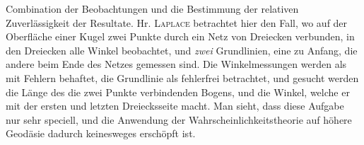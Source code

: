 Combination der Beobachtungen und die Bestimmung der relativen Zuverlässigkeit der Resultate. Hr. \textsc{Laplace} betrachtet hier den Fall, wo auf der Oberfläche einer Kugel zwei Punkte durch ein Netz von Dreiecken verbunden, in den Dreiecken alle Winkel beobachtet, und \emph{zwei} Grundlinien, eine zu Anfang, die andere beim Ende des Netzes gemessen sind. Die Winkelmessungen werden als mit Fehlern behaftet, die Grundlinie als fehlerfrei betrachtet, und gesucht werden die Länge des die zwei Punkte verbindenden Bogens, und die Winkel, welche er mit der ersten und letzten Dreiecksseite macht. Man sieht, dass diese Aufgabe nur sehr speciell, und die Anwendung der Wahrscheinlichkeitstheorie auf höhere Geodäsie dadurch keinesweges erschöpft ist.
